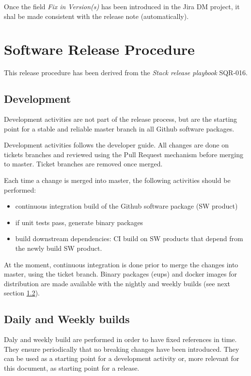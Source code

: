 Once the field \textit{Fix in Version(s)} has been introduced in the Jira DM project, it shal be made consistent with the release note (automatically).


\newpage
\section{Software Release Procedure} \label{sect:releaseprocedure}

This release procedure has been derived from the \textit{Stack release playbook} SQR-016.

\subsection{Development} \label{sect:dev}

Development activities are not part of the release process, but are the starting point for a stable and reliable master branch in all Github software packages.

Development activities follows the \citep{DevGuide} developer guide. All changes are done on tickets branches and reviewed using the Pull Request mechanism before merging to master.
Ticket branches are removed once merged.

Each time a change is merged into master, the following activities should be performed:

\begin{itemize}
\item continuous integration build of the Github software package (SW product)
\item if unit tests pass, generate binary packages
\item build downstream dependencies: CI build on SW products that depend from the newly build SW product.
\end{itemize}

At the moment, continuous integration is done prior to merge the changes into master, using the ticket branch. Binary packages (eups) and docker images for distribution are made available with the nightly and weekly builds (see next section \ref{sect:weekly}).


\subsection{Daily and Weekly builds} \label{sect:weekly}

Daly and weekly build are performed in order to have fixed references in time.
They ensure periodically that no breaking changes have been introduced. 
They can be used as a starting point for a development activity or, more relevant for this document, as starting point for a release.

